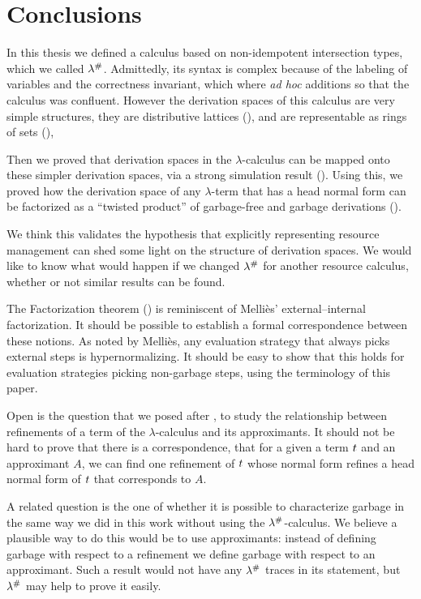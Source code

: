 \chapter{Conclusions}
\label{ch:conclusions}

In this thesis we defined a calculus based on non-idempotent intersection types,
which we called $\lambda^{\mathtt{\#}}$.
Admittedly, its syntax is complex because of the labeling of variables
and the correctness invariant, which where \textit{ad hoc}
additions so that the calculus was confluent.
However the derivation spaces of this calculus are very simple structures,
they are distributive lattices (),
and are representable as rings of sets (),

Then we proved that derivation spaces in the $\lambda$-calculus
can be mapped onto these simpler derivation spaces, via a strong
simulation result ().
Using this, we proved how the derivation space of any $\lambda$-term that has a
head normal form can be factorized as a ``twisted product'' of garbage-free
and garbage derivations ().

We think this validates the hypothesis that explicitly representing resource
management can shed some light on the structure of derivation spaces.
We would like to know what would happen if we changed $\lambda^{\mathtt{\#}}$ for
another resource calculus, whether or not similar results can be found.

The Factorization theorem ()
is reminiscent of Melliès’ \cite{DBLP:conf/ctcs/Mellies97} external--internal
factorization. It should be possible to establish a formal correspondence between these
notions. As noted by Melliès, any evaluation strategy that always picks external steps is
hypernormalizing. It should be easy to show that this holds for evaluation strategies picking
non-garbage steps, using the terminology of this paper.

Open is the question that we posed after ,
to study the relationship between refinements of a term of the $\lambda$-calculus
and its approximants.
It should not be hard to prove that there is a correspondence,
\ie that for a given a term $t$ and an approximant $A$,
we can find one refinement of $t$ whose normal form refines a head normal form of $t$
that corresponds to $A$.

A related question is the one of whether it is possible to characterize garbage in the same
way we did in this work without using the $\lambda^{\mathtt{\#}}$-calculus.
We believe a plausible way to do this would be to use approximants:
instead of defining garbage with respect to a refinement we define garbage
with respect to an approximant.
Such a result would not have any $\lambda^{\mathtt{\#}}$ traces in its statement,
but $\lambda^{\mathtt{\#}}$ may help to prove it easily.

